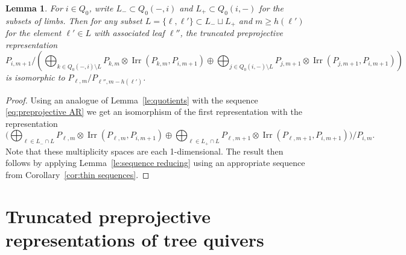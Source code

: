 \documentclass{amsart}
\newtheorem{lemma}[theorem]{Lemma}
\numberwithin{equation}{section}
\newcommand{\Irr}{\operatorname{Irr}}
\begin{document}
\begin{lemma}
  For $i\in Q_0$, write $L_-\subset Q_0(-,i)$ and $L_+\subset Q_0(i,-)$ for the subsets of limbs.
  Then for any subset $L=\{\ell,\ell'\}\subset L_-\sqcup L_+$ and $m\ge h(\ell')$ for the element $\ell'\in L$ with associated leaf $\ell''$, the truncated preprojective representation
  \[
    P_{i,m+1}/\left( \bigoplus_{k\in Q_0(-,i)\setminus L} P_{k,m}\otimes \Irr(P_{k,m},P_{i,m+1}) \oplus \bigoplus_{j\in Q_0(i,-)\setminus L} P_{j,m+1}\otimes \Irr(P_{j,m+1},P_{i,m+1}) \right)
  \]
  is isomorphic to $P_{\ell,m}/P_{\ell'',m-h(\ell')}$.
  \[
  \]
\end{lemma}
\begin{proof}
  Using an analogue of Lemma~\ref{le:quotients} with the sequence \eqref{eq:preprojective AR} we get an isomorphism of the first representation with the representation
  \[
    \Big( \bigoplus_{\ell\in L_-\cap L} P_{\ell,m}\otimes \Irr(P_{\ell,m},P_{i,m+1}) \oplus \bigoplus_{\ell\in L_+\cap L} P_{\ell,m+1}\otimes \Irr(P_{\ell,m+1},P_{i,m+1}) \Big)/P_{i,m}.
  \]
  Note that these multiplicity spaces are each 1-dimensional.
  The result then follows by applying Lemma~\ref{le:sequence reducing} using an appropriate sequence from Corollary~\ref{cor:thin sequences}.
\end{proof}

\section{Truncated preprojective representations of tree quivers}
\end{document}
